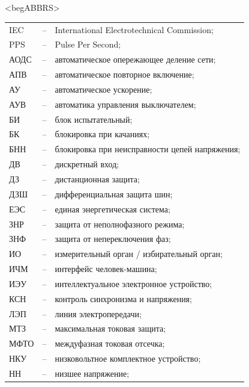\color{unimain}\section*{}
{\color{white}\fontsize{0.1pt}{0.1pt}\selectfont<begABBRS>}
\color{black}
\begin{longtable}{>{\raggedright\arraybackslash}m{2cm}>{\raggedright\arraybackslash}m{0.5cm}>{\raggedright\arraybackslash}m{20cm}}
\endfirsthead\endhead\endfoot\endlastfoot
IEC & -- &  International Electrotechnical Commission; \\
PPS & -- & Pulse Per Second; \\
АОДС & -- & автоматическое опережающее деление сети; \\
АПВ & -- & автоматическое повторное включение; \\
АУ & -- & автоматическое ускорение; \\
АУВ & -- & автоматика управления выключателем; \\
БИ & -- & блок испытательный; \\
БК & -- & блокировка при качаниях; \\
БНН & -- & блокировка при неисправности цепей напряжения; \\
ДВ & -- & дискретный вход; \\
ДЗ & -- & дистанционная защита; \\
ДЗШ & -- & дифференциальная защита шин; \\
ЕЭС & -- & единая энергетическая система; \\
ЗНР & -- & защита от неполнофазного режима; \\
ЗНФ & -- & защита от непереключения фаз; \\
ИО & -- & измерительный орган / избирательный орган; \\
ИЧМ & -- & интерфейс человек-машина; \\
ИЭУ & -- & интеллектуальное электронное устройство; \\
КСН & -- & контроль синхронизма и напряжения; \\
ЛЭП & -- & линия электропередачи; \\
МТЗ & -- & максимальная токовая защита; \\
МФТО & -- & междуфазная токовая отсечка; \\
НКУ & -- & низковольтное комплектное устройство; \\
НН & -- & низшее напряжение; \\

\end{longtable}
